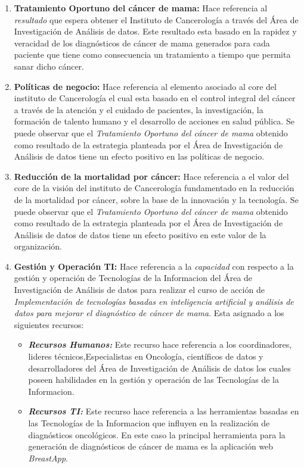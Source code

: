 \begin{enumerate}[label=\textbf{\arabic*})]
	
\item  \textbf{Tratamiento Oportuno del cáncer de mama:} Hace referencia al \textit{resultado} que espera obtener el Instituto de Cancerología a través del Área de Investigación de Análisis de datos. Este resultado esta basado en la rapidez y veracidad de los diagnósticos de cáncer de mama generados para cada paciente que tiene como consecuencia un tratamiento a tiempo que permita sanar dicho cáncer.

\item  \textbf{Políticas de negocio:} Hace referencia al elemento asociado al core del instituto de Cancerología el cual esta basado en el control integral del cáncer a través de la atención y el cuidado de pacientes, la investigación, la formación de talento humano y el desarrollo de acciones en salud pública. Se puede observar que  el  \textit{Tratamiento Oportuno del cáncer de mama} obtenido como resultado  de la estrategia planteada por el  Área de Investigación de Análisis de datos tiene un efecto positivo en las políticas de negocio.

\newpage
\item  \textbf{Reducción  de la mortalidad  por cáncer:} Hace referencia a el valor   del core de la visión del instituto de Cancerología fundamentado en la reducción de la mortalidad por cáncer, sobre la base de la innovación y la tecnología. Se puede observar que  el  \textit{Tratamiento Oportuno del cáncer de mama} obtenido como resultado  de la estrategia planteada por el  Área de Investigación de Análisis de datos de datos tiene un efecto positivo en este valor de la organización.

\item  \textbf{Gestión y Operación TI:} Hace referencia a la \textit{capacidad} con respecto a la gestión y operación de Tecnologías de  la Informacion del Área de Investigación de Análisis de datos para realizar el curso de acción de \textit{Implementación de tecnologías basadas en  inteligencia artificial y análisis de datos para 	mejorar  el diagnóstico de cáncer de mama}. Esta asignado a los siguientes recursos:
	
\begin{itemize}
		\item  \textbf{\textit{Recursos Humanos:}} Este recurso hace referencia a los coordinadores, lideres técnicos,Especialistas en Oncología, científicos de datos  y desarrolladores del Área de Investigación de Análisis de datos los cuales poseen habilidades en la gestión y operación de las Tecnologías de la Informacion.
		
		\item  \textbf{\textit{Recursos TI:}} Este recurso hace referencia a las herramientas basadas en las Tecnologías de la Informacion que influyen en la realización de diagnósticos oncológicos. En este caso la principal herramienta para la generación de diagnósticos de cáncer de mama es la aplicación web \textit{BreastApp}.
\end{itemize}
	
\end{enumerate}


